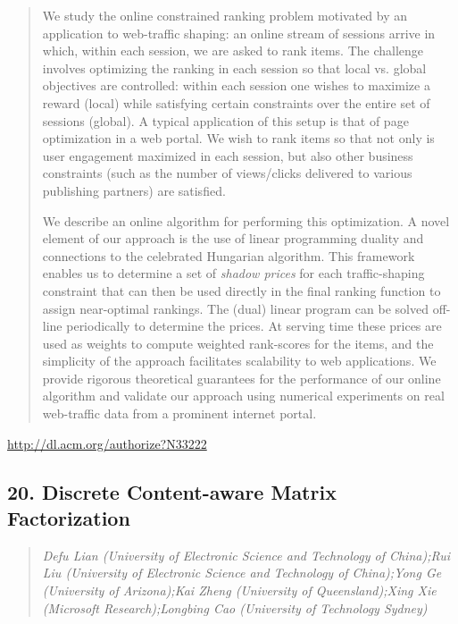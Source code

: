 \documentclass{article}
\begin{document}
\begin{quote}
We study the online constrained ranking problem motivated by an application to web-traffic shaping: an online stream of sessions arrive in which, within each session, we are asked to rank items. The challenge involves optimizing the ranking in each session so that local vs. global objectives are controlled: within each session one wishes to maximize a reward (local) while satisfying certain constraints over the entire set of sessions (global). A typical application of this setup is that of page optimization in a web portal. We wish to rank items so that not only is user engagement maximized in each session, but also other business constraints (such as the number of views/clicks delivered to various publishing partners) are satisfied.







  We describe an online algorithm for performing this optimization. A novel element of our approach is the use of linear programming duality and connections to the celebrated Hungarian algorithm. This framework enables us to determine a set of \emph{shadow prices} for each traffic-shaping constraint that can then be used directly in the final ranking function to assign near-optimal rankings. The (dual) linear program can be solved off-line periodically to determine the prices. At serving time these prices are used as weights to compute weighted rank-scores for the items, and the simplicity of the approach facilitates scalability to web applications. We provide rigorous theoretical guarantees for the performance of our online algorithm and validate our approach using numerical experiments on real web-traffic data from a prominent internet portal.
\end{quote}

\href{http://dl.acm.org/authorize?N33222}{http://dl.acm.org/authorize?N33222}

\subsection{20. Discrete Content-aware Matrix Factorization}

\begin{quote}
\footnotesize{\textit{Defu Lian (University of Electronic Science and Technology of China);Rui Liu (University of Electronic Science and Technology of China);Yong Ge (University of Arizona);Kai Zheng (University of Queensland);Xing Xie (Microsoft Research);Longbing Cao (University of Technology Sydney)}}

\end{quote}
\end{document}
